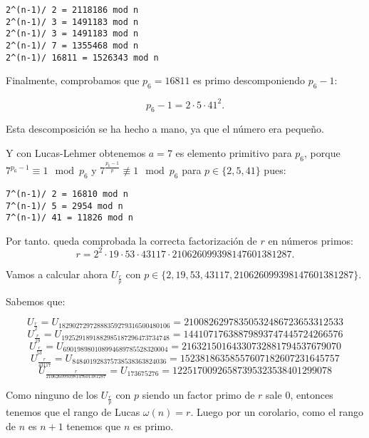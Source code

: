 \documentclass[a4paper]{article}
\begin{document}
\begin{verbatim}
2^(n-1)/ 2 = 2118186 mod n
2^(n-1)/ 3 = 1491183 mod n
2^(n-1)/ 3 = 1491183 mod n
2^(n-1)/ 7 = 1355468 mod n
2^(n-1)/ 16811 = 1526343 mod n
\end{verbatim}

Finalmente, comprobamos que $p_6=16811$ es primo descomponiendo $p_6-1$:

$$p_6-1=2\cdot 5\cdot 41^2.$$

Esta descomposición se ha hecho a mano, ya que el número era pequeño.

Y con Lucas-Lehmer obtenemos $a=7$ es elemento primitivo para $p_6$, porque $7^{p_6-1}\equiv 1\mod p_6$ y $7^{\frac{p_6-1}{p}}\not\equiv 1\mod p_6 $ para $p\in\{2, 5, 41\}$ pues:

\begin{verbatim}
7^(n-1)/ 2 = 16810 mod n
7^(n-1)/ 5 = 2954 mod n
7^(n-1)/ 41 = 11826 mod n
\end{verbatim}

Por tanto. queda comprobada la correcta factorización de $r$ en números primos:
$$r=2^2\cdot 19\cdot 53\cdot 43117\cdot 210626099398147601381287.$$

Vamos a calcular ahora $U_{\frac{r}{p}}$ con $p\in\{2,19,53,43117,210626099398147601381287\}$.

Sabemos que:

$$U_{\frac{r}{2}} = U_{18290272972888359279316500480106}=21008262978350532486723653312533$$
$$U_{\frac{r}{19}} = U_{1925291891882985187296473734748}=14410717638879893747445724266576$$
$$U_{\frac{r}{53}} = U_{690198980108994689785528320004}=21632150164330732881794537679070$$
$$U_{\frac{r}{43117}} = U_{848401928375738538363824036}=15238186358557607182607231645757$$
$$U_{\frac{r}{210626099398147601381287}} = U_{173675276}=12251700926587395323538401299078$$

Como ninguno de los $U_{\frac{r}{p}}$ con $p$ siendo un factor primo de $r$ sale 0, entonces tenemos que el rango de Lucas $\omega (n)=r$. Luego por un corolario, como el rango de $n$ es $n+1$ tenemos que $n$ es primo.
\end{document}
